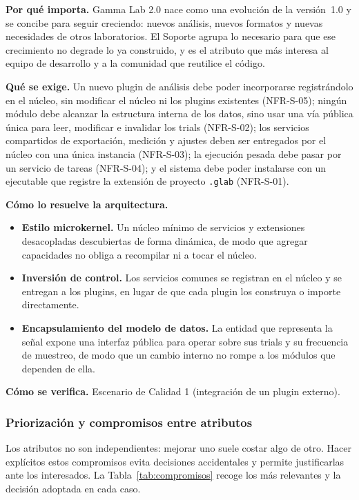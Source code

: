 \documentclass[11pt,a4paper]{article}
\DeclareRobustCommand{\_}{\textunderscore\allowbreak}
\begin{document}
\textbf{Por qué importa.} Gamma Lab 2.0 nace como una evolución de la versión~1.0 y se concibe para seguir creciendo: nuevos análisis, nuevos formatos y nuevas necesidades de otros laboratorios. El Soporte agrupa lo necesario para que ese crecimiento no degrade lo ya construido, y es el atributo que más interesa al equipo de desarrollo y a la comunidad que reutilice el código.

\textbf{Qué se exige.} Un nuevo plugin de análisis debe poder incorporarse registrándolo en el núcleo, sin modificar el núcleo ni los plugins existentes (NFR-S-05); ningún módulo debe alcanzar la estructura interna de los datos, sino usar una vía pública única para leer, modificar e invalidar los trials (NFR-S-02); los servicios compartidos de exportación, medición y ajustes deben ser entregados por el núcleo con una única instancia (NFR-S-03); la ejecución pesada debe pasar por un servicio de tareas (NFR-S-04); y el sistema debe poder instalarse con un ejecutable que registre la extensión de proyecto \texttt{.glab} (NFR-S-01).

\textbf{Cómo lo resuelve la arquitectura.}
\begin{itemize}[nosep]
    \item \textbf{Estilo microkernel.} Un núcleo mínimo de servicios y extensiones desacopladas descubiertas de forma dinámica, de modo que agregar capacidades no obliga a recompilar ni a tocar el núcleo.
    \item \textbf{Inversión de control.} Los servicios comunes se registran en el núcleo y se entregan a los plugins, en lugar de que cada plugin los construya o importe directamente.
    \item \textbf{Encapsulamiento del modelo de datos.} La entidad que representa la señal expone una interfaz pública para operar sobre sus trials y su frecuencia de muestreo, de modo que un cambio interno no rompe a los módulos que dependen de ella.
\end{itemize}

\textbf{Cómo se verifica.} Escenario de Calidad 1 (integración de un plugin externo).

\subsubsection{Priorización y compromisos entre atributos}

Los atributos no son independientes: mejorar uno suele costar algo de otro. Hacer explícitos estos compromisos evita decisiones accidentales y permite justificarlas ante los interesados. La Tabla~\ref{tab:compromisos} recoge los más relevantes y la decisión adoptada en cada caso.
\end{document}
